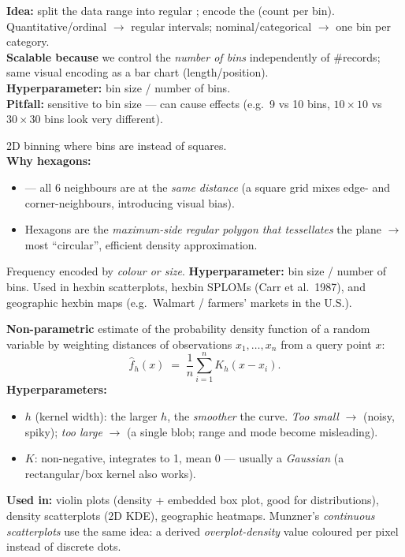 \begin{algobox}
\textbf{Idea:} split the data range into regular ;
encode the  (count per bin). Quantitative/ordinal $\to$ regular
intervals; nominal/categorical $\to$ one bin per category.\\
\textbf{Scalable because} we control the \emph{number of bins} independently of
\#records; same visual encoding as a bar chart (length/position).\\
\textbf{Hyperparameter:} bin size / number of bins.\\
\textbf{Pitfall:} sensitive to bin size --- can cause  effects
(e.g.\ 9 vs 10 bins, $10\times10$ vs $30\times30$ bins look very different).
\end{algobox}

\begin{algobox}
2D binning where bins are  instead of squares.\\
\textbf{Why hexagons:}
\begin{itemize}
  \item {} --- all 6 neighbours are at the
        \emph{same distance} (a square grid mixes edge- and corner-neighbours,
        introducing visual bias).
  \item Hexagons are the \emph{maximum-side regular polygon that tessellates}
        the plane $\to$ most ``circular'', efficient density approximation.
\end{itemize}
Frequency encoded by \emph{colour or size}. \textbf{Hyperparameter:} bin size /
number of bins. Used in hexbin scatterplots, hexbin SPLOMs (Carr et al.\ 1987),
and geographic hexbin maps (e.g.\ Walmart / farmers' markets in the U.S.).
\end{algobox}

\begin{algobox}
\textbf{Non-parametric} estimate of the probability density function of a
random variable by weighting distances of observations $x_1,\dots,x_n$ from a
query point $x$:
\[
  \widehat{f}_h(x) \;=\; \frac{1}{n}\sum_{i=1}^{n} K_h\!\left(x - x_i\right).
\]
\textbf{Hyperparameters:}
\begin{itemize}
  \item {} $h$ (kernel width): the larger $h$, the
        \emph{smoother} the curve.
        \emph{Too small} $\to$  (noisy, spiky);
        \emph{too large} $\to$  (a single blob; range and
        mode become misleading).
  \item {} $K$: non-negative, integrates to 1, mean 0 ---
        usually a \emph{Gaussian} (a rectangular/box kernel also works).
\end{itemize}
\textbf{Used in:} violin plots (density + embedded box plot, good for
 distributions), density scatterplots (2D KDE), geographic
heatmaps. Munzner's \emph{continuous scatterplots} use the same idea: a derived
\emph{overplot-density} value coloured per pixel instead of discrete dots.
\end{algobox}


